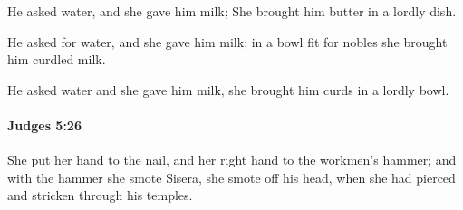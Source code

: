 			\begin{versebox}
					\item[BHS] 
					\item[ASV] He asked water, and she gave him milk; She brought him butter in a lordly dish.
					\item[NIV] He asked for water, and she gave him milk; in a bowl fit for nobles she brought him curdled milk.
					\item[NRSV] He asked water and she gave him milk, she brought him curds in a lordly bowl.
			\end{versebox}

		\paragraph{Judges 5:26} %
			\label{JUDGES-5-26}

			She put her hand to the nail, and her right hand to the workmen’s hammer; and with the hammer she smote Sisera, she smote off his head, when she had pierced and stricken through his temples.

